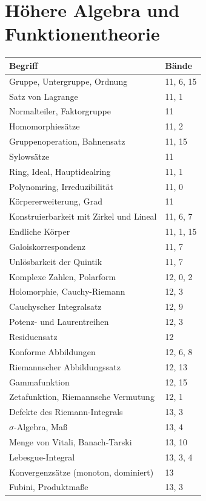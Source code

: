 \section*{Höhere Algebra und Funktionentheorie}
\nopagebreak
{\small\renewcommand{\arraystretch}{1.32}
\begin{longtable}{@{}P{5.6cm}P{2.8cm}@{}}
\toprule
\textbf{Begriff} & \textbf{Bände}\\
\midrule
\endhead
Gruppe, Untergruppe, Ordnung & 11, 6, 15\\
Satz von Lagrange & 11, 1\\
Normalteiler, Faktorgruppe & 11\\
Homomorphiesätze & 11, 2\\
Gruppenoperation, Bahnensatz & 11, 15\\
Sylowsätze & 11\\
Ring, Ideal, Hauptidealring & 11, 1\\
Polynomring, Irreduzibilität & 11, 0\\
Körpererweiterung, Grad & 11\\
Konstruierbarkeit mit Zirkel und Lineal & 11, 6, 7\\
Endliche Körper & 11, 1, 15\\
Galoiskorrespondenz & 11, 7\\
Unlösbarkeit der Quintik & 11, 7\\
Komplexe Zahlen, Polarform & 12, 0, 2\\
Holomorphie, Cauchy-Riemann & 12, 3\\
Cauchyscher Integralsatz & 12, 9\\
Potenz- und Laurentreihen & 12, 3\\
Residuensatz & 12\\
Konforme Abbildungen & 12, 6, 8\\
Riemannscher Abbildungssatz & 12, 13\\
Gammafunktion & 12, 15\\
Zetafunktion, Riemannsche Vermutung & 12, 1\\
Defekte des Riemann-Integrals & 13, 3\\
$\sigma$-Algebra, Maß & 13, 4\\
Menge von Vitali, Banach-Tarski & 13, 10\\
Lebesgue-Integral & 13, 3, 4\\
Konvergenzsätze (monoton, dominiert) & 13\\
Fubini, Produktmaße & 13, 3\\

\end{longtable}}
